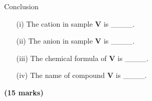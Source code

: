 \begin{enumerate}
\begin{center}
\end{center}

Conclusion\\

\begin{enumerate}
\item[(i)] The cation in sample \textbf{V} is \_\_\_\_.\\
\item[(ii)] The anion in sample \textbf{V} is \_\_\_\_.\\
\item[(iii)] The chemical formula of \textbf{V} is \_\_\_\_.\\
\item[(iv)] The name of compound \textbf{V} is \_\_\_\_.\\
\end{enumerate}


\raggedleft \textbf{(15 marks)} \pagebreak

\raggedright

\end{enumerate}